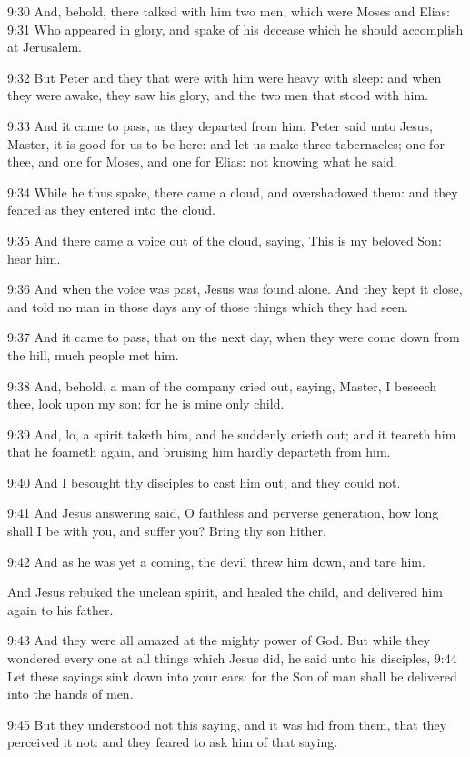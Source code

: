 9:30 And, behold, there talked with him two men, which were Moses and Elias: 9:31 Who appeared in glory, and spake of his decease which he should accomplish at Jerusalem.

9:32 But Peter and they that were with him were heavy with sleep: and when they were awake, they saw his glory, and the two men that stood with him.

9:33 And it came to pass, as they departed from him, Peter said unto Jesus, Master, it is good for us to be here: and let us make three tabernacles; one for thee, and one for Moses, and one for Elias: not knowing what he said.

9:34 While he thus spake, there came a cloud, and overshadowed them: and they feared as they entered into the cloud.

9:35 And there came a voice out of the cloud, saying, This is my beloved Son: hear him.

9:36 And when the voice was past, Jesus was found alone. And they kept it close, and told no man in those days any of those things which they had seen.

9:37 And it came to pass, that on the next day, when they were come down from the hill, much people met him.

9:38 And, behold, a man of the company cried out, saying, Master, I beseech thee, look upon my son: for he is mine only child.

9:39 And, lo, a spirit taketh him, and he suddenly crieth out; and it teareth him that he foameth again, and bruising him hardly departeth from him.

9:40 And I besought thy disciples to cast him out; and they could not.

9:41 And Jesus answering said, O faithless and perverse generation, how long shall I be with you, and suffer you? Bring thy son hither.

9:42 And as he was yet a coming, the devil threw him down, and tare him.

And Jesus rebuked the unclean spirit, and healed the child, and delivered him again to his father.

9:43 And they were all amazed at the mighty power of God. But while they wondered every one at all things which Jesus did, he said unto his disciples, 9:44 Let these sayings sink down into your ears: for the Son of man shall be delivered into the hands of men.

9:45 But they understood not this saying, and it was hid from them, that they perceived it not: and they feared to ask him of that saying.

